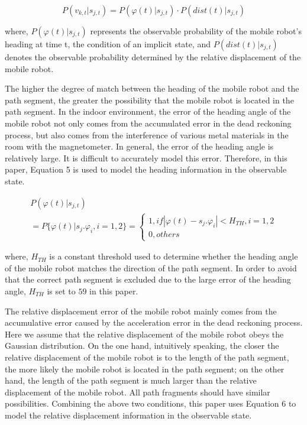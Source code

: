 \documentclass{llncs}
\begin{document}
\begin{equation}
	P({v_{k,t}}|{s_{j,t}}) = P(\varphi (t)|{s_{j,t}}) \cdot P(dist(t)|{s_{j,t}})
\end{equation}

where, $P(\varphi (t)|{s_{j,t}})$ represents the observable probability of the mobile robot's heading at time t, the condition of an implicit state, and $P(dist(t)|{s_{j,t}})$ denotes the observable probability determined by the relative displacement of the mobile robot.

The higher the degree of match between the heading of the mobile robot and the path segment, the greater the possibility that the mobile robot is located in the path segment. In the indoor environment, the error of the heading angle of the mobile robot not only comes from the accumulated error in the dead reckoning process, but also comes from the interference of various metal materials in the room with the magnetometer. In general, the error of the heading angle is relatively large. It is difficult to accurately model this error. Therefore, in this paper, Equation 5 is used to model the heading information in the observable state.

\begin{equation}
\begin{array}{l}
P(\varphi (t)|{s_{j,t}})\\
= P\{ \varphi (t)|{s_j}.{\varphi _i},i = 1,2\}  = \left\{ {\begin{array}{*{20}{l}}
	{1,if|\varphi (t) - {s_j}.{\varphi _i}| < {H_{TH}},i = 1,2}\\
	{0,others}
	\end{array}} \right.
\end{array}
\end{equation}

where, $H_{TH}$ is a constant threshold used to determine whether the heading angle of the mobile robot matches the direction of the path segment. In order to avoid that the correct path segment is excluded due to the large error of the heading angle, $H_{TH}$ is set to $59$ in this paper.

The relative displacement error of the mobile robot mainly comes from the accumulative error caused by the acceleration error in the dead reckoning process. Here we assume that the relative displacement of the mobile robot obeys the Gaussian distribution. On the one hand, intuitively speaking, the closer the relative displacement of the mobile robot is to the length of the path segment, the more likely the mobile robot is located in the path segment; on the other hand, the length of the path segment is much larger than the relative displacement of the mobile robot. All path fragments should have similar possibilities. Combining the above two conditions, this paper uses Equation 6 to model the relative displacement information in the observable state.
\end{document}
